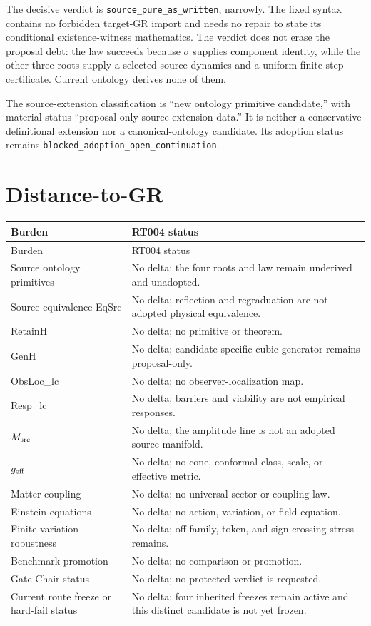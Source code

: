\documentclass[11pt]{article}
\begin{document}
The decisive verdict is \texttt{source\_pure\_as\_written}, narrowly.  The
fixed syntax contains no forbidden target-GR import and needs no repair to
state its conditional existence-witness mathematics.  The verdict does not
erase the proposal debt: the law succeeds because $\sigma$ supplies component
identity, while the other three roots supply a selected source dynamics and a
uniform finite-step certificate.  Current ontology derives none of them.

The source-extension classification is ``new ontology primitive candidate,''
with material status ``proposal-only source-extension data.''  It is neither a
conservative definitional extension nor a canonical-ontology candidate.  Its
adoption status remains \texttt{blocked\_adoption\_open\_continuation}.

\section{Distance-to-GR}

\begin{longtable}{p{}p{}}
\toprule
Burden & RT004 status \\
\midrule
\endfirsthead
\toprule
Burden & RT004 status \\
\midrule
\endhead
Source ontology primitives & No delta; the four roots and law remain underived and unadopted. \\
Source equivalence EqSrc & No delta; reflection and regraduation are not adopted physical equivalence. \\
RetainH & No delta; no primitive or theorem. \\
GenH & No delta; candidate-specific cubic generator remains proposal-only. \\
ObsLoc\_lc & No delta; no observer-localization map. \\
Resp\_lc & No delta; barriers and viability are not empirical responses. \\
$M_{\rm src}$ & No delta; the amplitude line is not an adopted source manifold. \\
$g_{\rm eff}$ & No delta; no cone, conformal class, scale, or effective metric. \\
Matter coupling & No delta; no universal sector or coupling law. \\
Einstein equations & No delta; no action, variation, or field equation. \\
Finite-variation robustness & No delta; off-family, token, and sign-crossing stress remains. \\
Benchmark promotion & No delta; no comparison or promotion. \\
Gate Chair status & No delta; no protected verdict is requested. \\
Current route freeze or hard-fail status & No delta; four inherited freezes remain active and this distinct candidate is not yet frozen. \\
\bottomrule
\end{longtable}
\end{document}
